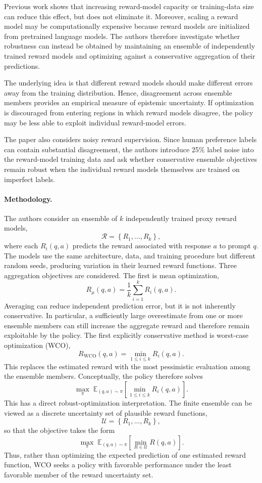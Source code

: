 \documentclass[11pt]{article}
\begin{document}
Previous work shows that increasing reward-model capacity or training-data size can reduce this effect, but does not eliminate it. Moreover, scaling a reward model may be computationally expensive because reward models are initialized from pretrained language models. The authors therefore investigate whether robustness can instead be obtained by maintaining an ensemble of independently trained reward models and optimizing against a conservative aggregation of their predictions.

The underlying idea is that different reward models should make different errors away from the training distribution. Hence, disagreement across ensemble members provides an empirical measure of epistemic uncertainty. If optimization is discouraged from entering regions in which reward models disagree, the policy may be less able to exploit individual reward-model errors.

The paper also considers noisy reward supervision. Since human preference labels can contain substantial disagreement, the authors introduce 25\% label noise into the reward-model training data and ask whether conservative ensemble objectives remain robust when the individual reward models themselves are trained on imperfect labels.

\paragraph{Methodology.}

The authors consider an ensemble of $k$ independently trained proxy reward models,
\[
\mathcal{R}
=
\left\{
R_1,\ldots,R_k
\right\},
\]
where each $R_i(q,a)$ predicts the reward associated with response $a$ to prompt $q$. The models use the same architecture, data, and training procedure but different random seeds, producing variation in their learned reward functions.
Three aggregation objectives are considered. The first is mean optimization,
\[
R_{\mu}(q,a)
=
\frac{1}{k}
\sum_{i=1}^{k}
R_i(q,a).
\]
Averaging can reduce independent prediction error, but it is not inherently conservative. In particular, a sufficiently large overestimate from one or more ensemble members can still increase the aggregate reward and therefore remain exploitable by the policy.
The first explicitly conservative method is worst-case optimization (WCO),
\[
R_{\mathrm{WCO}}(q,a)
=
\min_{1\leq i\leq k}
R_i(q,a).
\]
This replaces the estimated reward with the most pessimistic evaluation among the ensemble members. Conceptually, the policy therefore solves
\[
\max_{\pi}
\;
\mathbb{E}_{(q,a)\sim\pi}
\left[
\min_{1\leq i\leq k}
R_i(q,a)
\right].
\]
This has a direct robust-optimization interpretation. The finite ensemble can be viewed as a discrete uncertainty set of plausible reward functions,
\[
\mathcal{U}
=
\left\{
R_1,\ldots,R_k
\right\},
\]
so that the objective takes the form
\[
\max_{\pi}
\;
\mathbb{E}_{(q,a)\sim\pi}
\left[
\min_{R\in\mathcal{U}}
R(q,a)
\right].
\]
Thus, rather than optimizing the expected prediction of one estimated reward function, WCO seeks a policy with favorable performance under the least favorable member of the reward uncertainty set.
\end{document}
